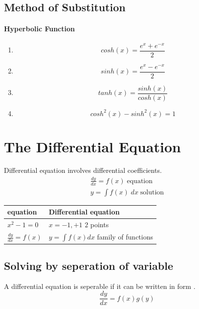\subsection{Method of Substitution} 
\paragraph{Hyperbolic Function}
\begin{enumerate}

  	\item 
	    \begin{equation*}
		    cosh(x) = \frac{e^{x}+e^{-x}}{2}
	    \end{equation*}
        \item 
	    \begin{equation*}
		sinh (x) = \frac{e^{x}-e^{-x}}{2}
	    \end{equation*}
	\item 
		\begin{equation*}
		    tanh(x) = \frac{sinh(x)}{cosh(x)}
		\end{equation*}
	\item 
		\begin{equation*}
		    cosh^{2}(x)- sinh^{2}(x) = 1
		\end{equation*}
\end{enumerate}

\section{ The Differential Equation} 
Differential equation involves differential coefficients. 
\begin{gather}
    \frac{dy}{dx} = f(x) \; \text{equation} \\
	y = \int f(x) \; dx \; \text{solution}
\end{gather}
 
\begin{tabular}{ll}
    \toprule
    equation     &    Differential equation \\
    \midrule
    $x^{2} -1=0$ & $x = -1 , +1$ $2$ points\\
    $\frac{dy}{dx}= f(x)$ & $ y  = \int f(x) dx $ family of functions \\
    \bottomrule
\end{tabular}

\subsection{Solving by seperation of variable} 
A differential equation  is seperable if it can be written in form . 
\begin{equation*}
    \frac{dy}{dx} = f(x) g(y)
\end{equation*}

